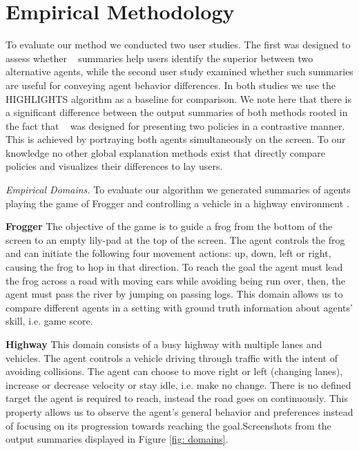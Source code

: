 
\section{Empirical Methodology} 
\label{sec: emp}

To evaluate our method we conducted two user studies. The first was designed to
assess whether \disalg~ summaries help users identify the superior between two alternative agents, while the second user study examined whether such
summaries are useful for conveying agent behavior differences. In both studies we
use the HIGHLIGHTS algorithm as a baseline for comparison. We note here that
there is a significant difference between the output summaries of both methods
rooted in the fact that \disalg~ was designed for presenting two policies in a contrastive manner. This is achieved by portraying both agents simultaneously on the screen.
To our knowledge no other global explanation methods exist that directly compare
 policies and visualizes their differences to lay users.

\emph{Empirical Domains.} To evaluate our algorithm we generated summaries of
agents playing the game of Frogger \cite{Frogger_game} and controlling a vehicle
in a highway environment \cite{highway-env}. 

\textbf{Frogger} The objective of the game is to guide a frog from the bottom of
the screen to an empty lily-pad at the top of the screen. The agent controls the
frog and can initiate the following four movement actions: up, down, left or
right, causing the frog to hop in that direction. To reach the goal the agent
must lead the frog across a road with moving cars while avoiding being run over,
then, the agent must pass the river by jumping on passing logs. This domain
allows us to compare different agents in a setting with ground truth information
about agents' skill, i.e. game score.

\textbf{Highway} This domain consists of a busy highway with multiple lanes and
vehicles. The
agent controls a vehicle driving through traffic with the intent of avoiding
collisions. The agent can choose to move right or left (changing lanes),
increase or decrease velocity or stay idle, i.e. make no change. There is no
defined target the agent is required to reach, instead the road goes on
continuously. This property allows us to observe the agent's general behavior and preferences
instead of focusing on its progression towards reaching the goal.Screenshots from the \disalg~ output summaries displayed in Figure \ref{fig:
domains}. 


